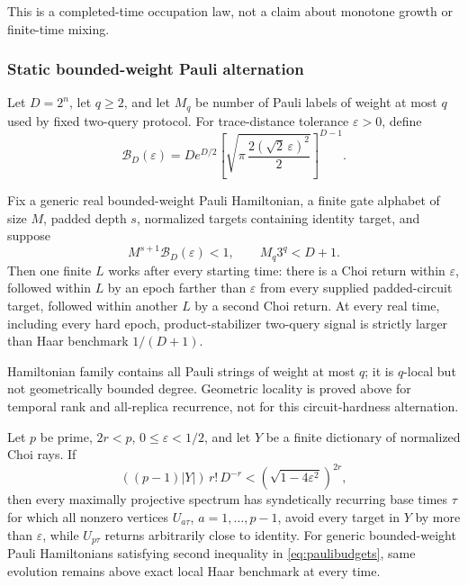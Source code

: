 This is a completed-time occupation law, not a claim about monotone growth or
finite-time mixing.

\subsubsection{Static bounded-weight Pauli alternation}

Let $D=2^n$, let $q\ge2$, and let $M_q$ be number of Pauli labels of weight
at most $q$ used by fixed two-query protocol.  For trace-distance tolerance
$\varepsilon>0$, define
\begin{equation}
 \mathcal B_D(\varepsilon)=
 D e^{D/2}
 \left[\sqrt{\pi\,\frac{2(\sqrt2\,\varepsilon)^2}{2}}\right]^{D-1}.
 \label{eq:paulicap}
\end{equation}

\begin{theorem}
\label{thm:paulialternation}
Fix a generic real bounded-weight Pauli Hamiltonian, a finite gate alphabet
of size $M$, padded depth $s$, normalized targets containing identity target,
and suppose
\begin{equation}
 M^{s+1}\mathcal B_D(\varepsilon)<1,
 \qquad M_q3^q<D+1.                                   \label{eq:paulibudgets}
\end{equation}
Then one finite $L$ works after every starting time: there is a Choi return
within $\varepsilon$, followed within $L$ by an epoch farther than
$\varepsilon$ from every supplied padded-circuit target, followed within
another $L$ by a second Choi return.  At every real time, including every
hard epoch, product-stabilizer two-query signal is strictly larger than Haar
benchmark $1/(D+1)$.
\end{theorem}

Hamiltonian family contains all Pauli strings of weight at most $q$; it is
$q$-local but not geometrically bounded degree.  Geometric locality is proved
above for temporal rank and all-replica recurrence, not for this
circuit-hardness alternation.

\begin{theorem}
\label{thm:primepolygon}
Let $p$ be prime, $2r<p$, $0\le\varepsilon<1/2$, and let $Y$ be a finite
dictionary of normalized Choi rays.  If
\begin{equation}
 ((p-1)|Y|)\,r!\,D^{-r}
 <\left(\sqrt{1-4\varepsilon^2}\right)^{2r},           \label{eq:polygonbudget}
\end{equation}
then every maximally projective spectrum has syndetically recurring base
times $\tau$ for which all nonzero vertices
$U_{a\tau}$, $a=1,\ldots,p-1$, avoid every target in $Y$ by more than
$\varepsilon$, while $U_{p\tau}$ returns arbitrarily close to identity.  For
generic bounded-weight Pauli Hamiltonians satisfying second inequality in
\eqref{eq:paulibudgets}, same evolution remains above exact local Haar
benchmark at every time.
\end{theorem}

